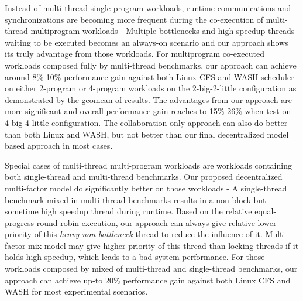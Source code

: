 \documentclass[sigplan,review,anonymous]{acmart}\settopmatter{printfolios=true,printccs=false,printacmref=false}
\begin{document}
Instead of multi-thread single-program workloads, runtime communications and synchronizations are becoming more frequent during the co-execution of multi-thread multiprogram workloads - Multiple bottlenecks and high speedup threads waiting to be executed becomes an always-on scenario and our approach shows its truly advantage from those workloads.
For multiprogram co-executed workloads composed fully by multi-thread benchmarks, our approach can achieve around 8\%-10\% performance gain against both Linux CFS and WASH scheduler on either 2-program or 4-program workloads on the 2-big-2-little configuration as demonstrated by the geomean of results. The advantages from our approach are more significant and overall performance gain reaches to 15\%-26\% when test on 4-big-4-little configuration. The collaboration-only approach can also do better than both Linux and WASH, but not better than our final decentralized model based approach in most cases. 

Special cases of multi-thread multi-program workloads are workloads containing both single-thread and multi-thread benchmarks. Our proposed decentralized multi-factor model do significantly better on those workloads - A single-thread benchmark mixed in multi-thread benchmarks results in a non-block but sometime high speedup thread during runtime. Based on the relative equal-progress round-robin execution, our approach can always give relative lower priority of this {\it heavy non-bottleneck} thread to reduce the influence of it. Multi-factor mix-model may give higher priority of this thread than locking threads if it holds high speedup, which leads to a bad system performance. 
For those workloads composed by mixed of multi-thread and single-thread benchmarks, our approach can achieve up-to 20\% performance gain against both Linux CFS and WASH for most experimental scenarios.
\end{document}
